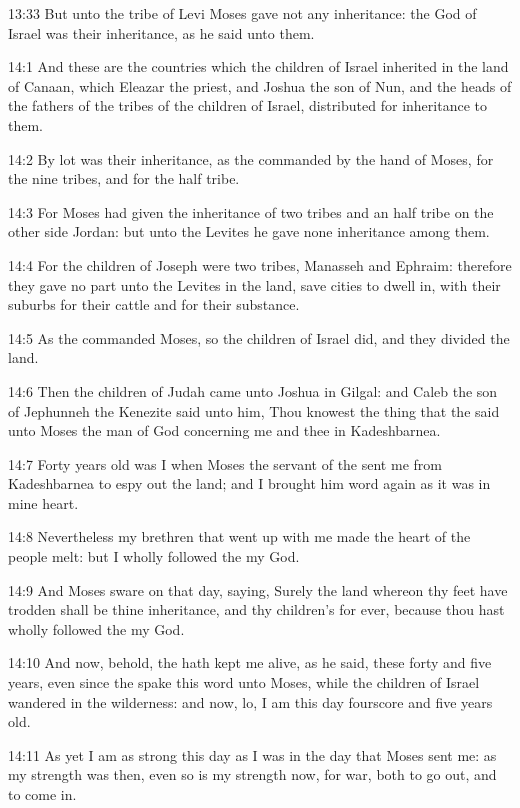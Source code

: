 13:33 But unto the tribe of Levi Moses gave not any inheritance: the
\LORD God of Israel was their inheritance, as he said unto them.

14:1 And these are the countries which the children of Israel
inherited in the land of Canaan, which Eleazar the priest, and Joshua
the son of Nun, and the heads of the fathers of the tribes of the
children of Israel, distributed for inheritance to them.

14:2 By lot was their inheritance, as the \LORD commanded by the hand
of Moses, for the nine tribes, and for the half tribe.

14:3 For Moses had given the inheritance of two tribes and an half
tribe on the other side Jordan: but unto the Levites he gave none
inheritance among them.

14:4 For the children of Joseph were two tribes, Manasseh and Ephraim:
therefore they gave no part unto the Levites in the land, save cities
to dwell in, with their suburbs for their cattle and for their
substance.

14:5 As the \LORD commanded Moses, so the children of Israel did, and
they divided the land.

14:6 Then the children of Judah came unto Joshua in Gilgal: and Caleb
the son of Jephunneh the Kenezite said unto him, Thou knowest the
thing that the \LORD said unto Moses the man of God concerning me and
thee in Kadeshbarnea.

14:7 Forty years old was I when Moses the servant of the \LORD sent me
from Kadeshbarnea to espy out the land; and I brought him word again
as it was in mine heart.

14:8 Nevertheless my brethren that went up with me made the heart of
the people melt: but I wholly followed the \LORD my God.

14:9 And Moses sware on that day, saying, Surely the land whereon thy
feet have trodden shall be thine inheritance, and thy children's for
ever, because thou hast wholly followed the \LORD my God.

14:10 And now, behold, the \LORD hath kept me alive, as he said, these
forty and five years, even since the \LORD spake this word unto Moses,
while the children of Israel wandered in the wilderness: and now, lo,
I am this day fourscore and five years old.

14:11 As yet I am as strong this day as I was in the day that Moses
sent me: as my strength was then, even so is my strength now, for war,
both to go out, and to come in.

